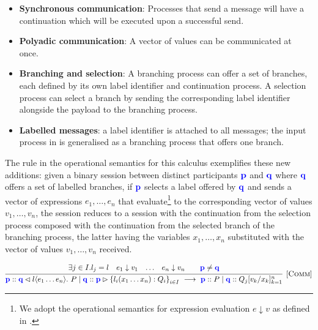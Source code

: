 \begin{itemize}
\item \textbf{Synchronous communication}: Processes that send a message will have a continuation which will be executed upon a successful send. 
\item \textbf{Polyadic communication}: A vector of values can be communicated at once.
\item \textbf{Branching and selection}: A branching process can offer a set of branches, each defined by its own label identifier and continuation process. A selection process can select a branch by sending the corresponding label identifier alongside the payload to the branching process.

\item \textbf{Labelled messages}: a label identifier is attached to all messages; the input process in \mathref{\ref{section_async}} is generalised as a branching process that offers one branch.
\end{itemize}

The  rule in the operational semantics for this calculus exemplifies these new additions: given a binary session between distinct participants ${\color{blue}\mathbf{p}}$ and ${\color{blue}\mathbf{q}}$ where ${\color{blue}\mathbf{q}}$ offers a set of labelled branches, if ${\color{blue}\mathbf{p}}$ selects a label offered by ${\color{blue}\mathbf{q}}$ and sends a vector of expressions $e_1, \dots, e_n$ that evaluate\footnote{We adopt the operational semantics for expression evaluation $e \downarrow v$ as defined in \cite{C406Lecture}.} to the corresponding vector of values $v_1, \dots, v_n$, the session reduces to a session with the continuation from the selection process composed with the continuation from the selected branch of the branching process, the latter having the variables $x_1, \dots, x_n$ substituted with the vector of values $v_1, \dots, v_n$ received.

\[
\infer[\mbox{\rulename{Comm}}]{
	\parti{p} :: \sel{\parti{q}}{l}{e_1 \dots e_n}.~P \mid 
	\parti{q} :: \bra{\parti{p}}{l_i(x_1 \dots x_n):Q_i}_{i\in I} ~\longrightarrow~ \parti{p} :: P \mid \parti{q} ::Q_j[v_k/x_k]^n_{k=1}
}{
	\begin{array}{cccccc}
	\exists	j \in I. l_j = l
	&
	e_1 \downarrow v_1 
	& \dots 
	& e_n \downarrow v_n
	&
	& \parti{p} \neq \parti{q}
	\end{array}
}
\]

